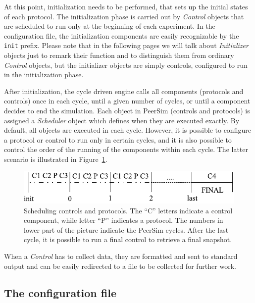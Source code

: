 \documentclass[a4paper,11pt]{article}
\begin{document}
At this point, initialization needs to be performed, that sets up the
initial states of each protocol.
The initialization phase is carried out by \emph{Control}
objects that are scheduled to run only at the beginning of each experiment.
In the configuration file,
the initialization components are easily recognizable by the
\texttt{init} prefix. Please note that in the following pages we will
talk about \emph{Initializer} objects just to remark their function and
to distinguish them from ordinary \emph{Control} objects, but the initializer
objects are simply controls, configured to run in the initialization phase.

After initialization, the cycle driven engine calls all components (protocols
and controls) once in each cycle, until a given number of cycles, or until
a component decides to end the simulation.
Each object in PeerSim (controls and protocols) is assigned a
\emph{Scheduler} object which defines when they are executed exactly.
By default, all objects are executed in each cycle.
However, it is possible to configure a protocol or control to run only in
certain cycles, and it is also possible to control the order of the running
of the components within each cycle.
The latter scenario is illustrated in Figure~\ref{obsfigure}. 


\begin{figure}
\begin{center}
\includegraphics[scale=1.1]{controls-protocols}
\end{center}
\caption{Scheduling controls and protocols. The ``C'' letters indicate a
  control component, while letter ``P'' indicates a protocol.
  The numbers in lower part of the picture indicate the
  PeerSim cycles. After the last cycle, it is possible to run a final
  control to retrieve a final snapshot.\label{obsfigure}}
\end{figure}


When a \emph{Control} has to collect data, they are formatted and sent to
standard output and can be easily redirected to a file to be collected
for further work. 


\subsection{The configuration file}
\label{configfile}
\end{document}
